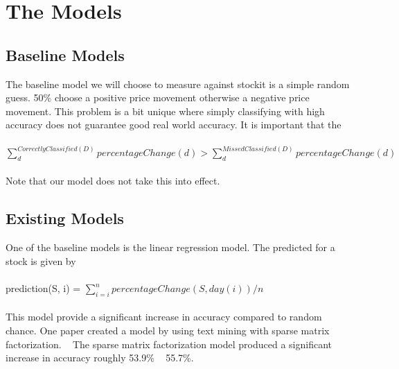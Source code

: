 \documentclass[11pt,letterpaper]{article}
\newcommand{\blue}[1]{\textcolor{RoyalBlue}{#1}}
\newcommand{\instructions}[1]{\blue{\textit{#1}}}
\begin{document}
\section{The Models}
\label{sec:models}

\subsection{Baseline Models}
\label{sec:baseline-models}
The baseline model we will choose to measure against stockit is a simple random guess.
50\% choose a positive price movement otherwise a negative price movement. This problem is a bit unique
where simply classifying with high accuracy does not guarantee good real world accuracy. It is important that the \\ \\
$\sum_{d}^{CorrectlyClassified(D)} percentageChange(d) > \sum_{d}^{MissedClassified(D)} percentageChange(d)$ \\ \\
Note that our model does not take this into effect.

\subsection{Existing Models}
\label{sec:existing-models}
One of the baseline models is the linear regression model. The predicted for a stock is given by \\ \\
prediction(S, i) = $\sum_{i=i}^{n} percentageChange(S, day(i)) / n$ \\ \\
This model provide a significant increase in accuracy compared to random chance.
One paper created a model by using text mining with sparse matrix factorization. ~\cite{stock-matrix}
The sparse matrix factorization model produced a significant increase in accuracy roughly 53.9\% ~ 55.7\%.
\end{document}
